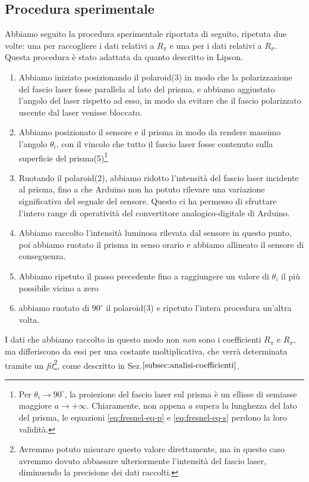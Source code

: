 \subsection{Procedura sperimentale}\label{subsec:procedura-sperimentale}
  Abbiamo seguito la procedura sperimentale riportata di seguito, ripetuta due
  volte: una per raccogliere i dati relativi a $R_\pi$ e una per i dati relativi
  a $R_\sigma$. Questa procedura è stato adattata da quanto descritto in Lipson\cite{lipson20}.
  \begin{enumerate}
    \item%
      Abbiamo iniziato posizionando il polaroid(3) in modo che la polarizzazione del
      fascio laser fosse parallela al lato del prisma, e abbiamo aggiustato l'angolo
      del laser rispetto ad esso, in modo da evitare che il fascio
      polarizzato uscente dal laser venisse bloccato.
    \item%
      Abbiamo posizionato il sensore e il prisma in modo da rendere
      massimo l'angolo $\theta_i$, con il vincolo che
      tutto il fascio laser fosse contenuto sulla superficie del prisma(5)\footnote{Per $\theta_i \to 90^\circ$, la
      proiezione del fascio laser sul prisma è un ellisse di semiasse maggiore $a \to +\infty$. Chiaramente, non appena
      $a$ supera la lunghezza del lato del prisma, le equazioni \eqref{eq:fresnel-eq-p} e \eqref{eq:fresnel-eq-s} perdono
      la loro validità.}
    \item%
      Ruotando il polaroid(2), abbiamo ridotto l’intensità del fascio laser
      incidente al prisma, fino a che Arduino non ha potuto rilevare una
      variazione significativa del segnale del sensore.
      Questo ci ha permesso di sfruttare l'intero range di operatività del convertitore analogico-digitale di Arduino.
    \item%
      Abbiamo raccolto l'intensità luminosa rilevata dal sensore in questo punto,
      poi abbiamo ruotato il prisma in senso orario e abbiamo
      allineato il sensore di conseguenza.
    \item%
      Abbiamo ripetuto il passo precedente fino a raggiungere un valore di $\theta_i$
      il più possibile vicino a zero
    \item%
      abbiamo ruotato di $90^\circ$ il polaroid(3) e ripetuto l'intera
      procedura un'altra volta.
  \end{enumerate}
  I dati che abbiamo raccolto in questo modo non \emph{non} sono
  i coefficienti $R_\pi$ e $R_\sigma$, ma differiscono da essi per una costante
  moltiplicativa, che verrà determinata tramite un \emph{fit}\footnote{Avremmo potuto misurare
  questo valore direttamente, ma in questo caso avremmo dovuto
  abbassare ulteriormente l'intensità del fascio laser, diminuendo la precisione dei
  dati raccolti.}, come descritto in Sez.$\ref{subsec:analisi-coefficienti}$. %
\endinput

